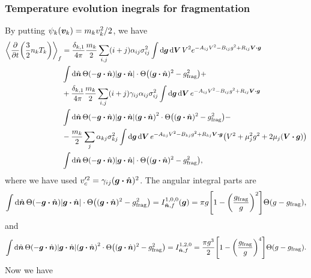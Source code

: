 \documentclass[aps,prl,preprint,groupedaddress,10pt]{revtex4-2}
\begin{document}
\subsubsection{Temperature evolution inegrals for fragmentation}
By putting $\psi_k(\vb*{v}_k)=m_kv_k^2/2$, we have
\begin{equation}
    \begin{split}
        \avg{\pdv{t}\pqty{\frac{3}{2}n_kT_k}}_f&=\frac{\delta_{k,1}}{4\pi}\frac{m_k}{2}
        \sum_{i,j}(i+j)\alpha_{ij}\sigma_{ij}^2\int\dd{\bg}\dd{\bV}V^2
        e^{-A_{ij}V^2-B_{ij}g^2+R_{ij}\bV\vdot\bg}\\
        &\int\dd{\bn}\Theta\pqty{-\bg\vdot\bn}\abs{\bg\vdot\bn}\cdot
        \Theta\pqty{(\bg\vdot\bn)^2-\ltx{g}{frag}^2}+\\
        &+\frac{\delta_{k,1}}{4\pi}\frac{m_k}{2}
        \sum_{i,j}(i+j)\gamma_{ij}\alpha_{ij}\sigma_{ij}^2\int\dd{\bg}\dd{\bV}
        e^{-A_{ij}V^2-B_{ij}g^2+R_{ij}\bV\vdot\bg}\\
        &\int\dd{\bn}\Theta\pqty{-\bg\vdot\bn}\abs{\bg\vdot\bn}\pqty{\bg\vdot\bn}^2\cdot
        \Theta\pqty{(\bg\vdot\bn)^2-\ltx{g}{frag}^2}-\\
        &-\frac{m_k}{2}\sum_{j}\alpha_{kj}\sigma_{kj}^2\int
        \dd{\bg}\dd{\bV}e^{-A_{kj}V^2-B_{kj}g^2+R_{kj}\bV\vdot\bg}
        \pqty{V^2+\mu_j^2g^2+2\mu_j\pqty{\bV\vdot\bg}}\\
        &\int\dd{\bn}\Theta\pqty{-\bg\vdot\bn}\abs{\bg\vdot\bn}\cdot
        \Theta\pqty{(\bg\vdot\bn)^2-\ltx{g}{frag}^2},
    \end{split}
\end{equation}
where we have used $v'^2_c=\gamma_{ij}(\bg\vdot\bn)^2$. The angular integral parts are
\begin{equation}
    \int\dd{\bn}\Theta\pqty{-\bg\vdot\bn}\abs{\bg\vdot\bn}\cdot
    \Theta\pqty{(\bg\vdot\bn)^2-\ltx{g}{frag}^2}=I_{\bn,f}^{1,0,0}(\bg)=
    \pi g\bqty{1-\pqty{\frac{\ltx{g}{frag}}{g}}^2}\Theta\pqty{g-\ltx{g}{frag}},
\end{equation}
and
\begin{equation}
    \int\dd{\bn}\Theta\pqty{-\bg\vdot\bn}\abs{\bg\vdot\bn}\pqty{\bg\vdot\bn}^2\cdot
    \Theta\pqty{(\bg\vdot\bn)^2-\ltx{g}{frag}^2}=I_{\bn,f}^{1,2,0}=
    \frac{\pi g^3}{2}\bqty{1-\pqty{\frac{\ltx{g}{frag}}{g}}^4}\Theta\pqty{g-\ltx{g}{frag}}.
\end{equation}
Now we have
\end{document}
